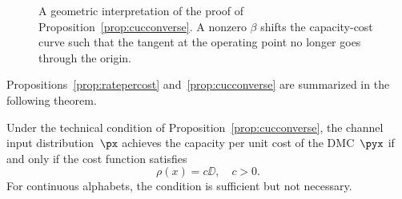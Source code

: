 \begin{figure}
  \begin{center}
  \end{center}
  \caption{A geometric interpretation of the proof of
  Proposition~\ref{prop:cucconverse}. A nonzero $\beta$ shifts the capacity-cost
  curve such that the tangent at the operating point no longer goes through the
  origin.}
  \label{fig:cuccongeom}
\end{figure}

Propositions~\ref{prop:ratepercost} and~\ref{prop:cucconverse} are summarized
in the following theorem. 

\begin{theorem}
  \label{thm:cuccond}
  Under the technical condition of Proposition~\ref{prop:cucconverse}, the
  channel input distribution~$\px$ achieves the capacity per unit cost of the
  DMC~$\pyx$ if and only if the cost function satisfies
  \begin{equation}
    \label{eq:optcostthm}
    \rho(x) = c \DD, \quad c > 0. 
  \end{equation}
  For continuous alphabets, the condition is sufficient but not necessary.
\end{theorem}


